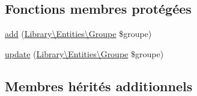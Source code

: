 \subsection*{Fonctions membres protégées}
\begin{DoxyCompactItemize}
\item 
\hyperlink{class_library_1_1_models_1_1_groupe_manager___p_d_o_a6d9990d08d849705ce64cc1e11153459}{add} (\hyperlink{class_library_1_1_entities_1_1_groupe}{Library\textbackslash{}\+Entities\textbackslash{}\+Groupe} \$groupe)
\item 
\hyperlink{class_library_1_1_models_1_1_groupe_manager___p_d_o_aa1522ff5f9e533f795b3be14c17c67c0}{update} (\hyperlink{class_library_1_1_entities_1_1_groupe}{Library\textbackslash{}\+Entities\textbackslash{}\+Groupe} \$groupe)
\end{DoxyCompactItemize}
\subsection*{Membres hérités additionnels}


